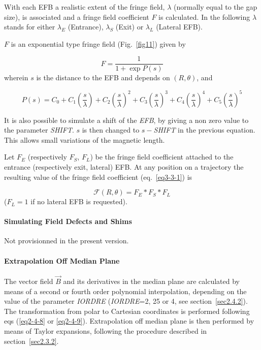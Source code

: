 \noindent With  each EFB a realistic extent of the fringe field, $\lambda$ 
(normally equal to the gap size), is associated and a fringe field coefficient
$ F $ is calculated. In the following $\lambda$ stands for either $ \lambda_ E $
(Entrance), $ \lambda_ S $ (Exit) or $ \lambda_ L $ (Lateral EFB).  


\bigskip

\noindent$ F $ is an exponential type fringe field (Fig.~\ref{fig11}) 
given by~\cite{Biblio12}     %

$$ F = \frac{1 }{ 1+ \exp P(s)} $$
%
 wherein $ s $ is the distance to the EFB and depends on $(R,\theta)$, and 

$$
    P(s) = C_0
       +C_1 \left(  \dfrac{s }{ \lambda} \right) 
       +C_2 \left( \dfrac{s }{ \lambda} \right)^2 
       + C_3 \left( \dfrac{s }{ \lambda} \right)^3 
       +C_4 \left( \dfrac{s }{ \lambda} \right)^4 
       + C_5 \left(\dfrac{s }{ \lambda} \right)^5 $$
       
\noindent It is also possible to simulate a shift of the \textsl{EFB}, by giving a non
zero value to the parameter \textsl{SHIFT}.  $ s $ is then changed to $ s -$\textsl{SHIFT} in the 
previous equation.   This allows small variations of the magnetic length.  
\bigskip

\noindent Let $ F_E $ (respectively $ F_S$, $F_L$)  be the fringe field
coefficient attached to the entrance (respectively exit, lateral) EFB. At any position on  a 
trajectory the resulting value of the fringe field coefficient (eq.~\ref{eq3-3-1}) is

$$  \mathcal{F}(R,\theta) = F_E  \ast  F_S \ast   F_L $$
%
($F_L=1 $ if no lateral EFB is requested). 



\paragraph{Simulating Field Defects and Shims }

\noindent Not provisionned in the present version. 


\bigskip

\paragraph{Extrapolation Off Median Plane} 

\noindent The vector field $ \vec  B $ and its derivatives in the median plane
are calculated by means of a second or fourth order polynomial 
interpolation, depending 
on the value of the parameter \textsl{IORDRE} (\textsl{IORDRE}=2, 25 or 4, see 
section~\ref{sec2.4.2}). 
The transformation from polar to Cartesian coordinates is 
performed following eqs (\ref{eq2-4-8} or \ref{eq2-4-9}). Extrapolation off median plane is then 
performed by means of Taylor expansions, following the procedure described 
in section~\ref{sec2.3.2}. 






